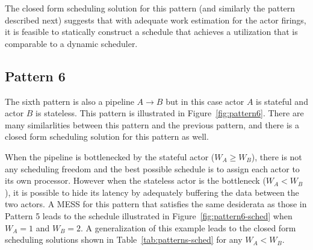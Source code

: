 The closed form scheduling solution for this pattern (and similarly
the pattern described next) suggests that with adequate work
estimation for the actor firings, it is feasible to statically
construct a schedule that achieves a utilization that is comparable to
a dynamic scheduler.

\subsection{Pattern 6}

The sixth pattern is also a pipeline $A\rightarrow B$ but in this case
actor $A$ is stateful and actor $B$ is stateless. This pattern is
illustrated in Figure~\ref{fig:pattern6}. There are many similarlities
between this pattern and the previous pattern, and there is a closed
form scheduling solution for this pattern as well. 

When the pipeline is bottlenecked by the stateful actor ($W_A \ge
W_B$), there is not any scheduling freedom and the best possible
schedule is to assign each actor to its own processor. However when
the stateless actor is the bottleneck ($W_A < W_B$), it is possible to
hide its latency by adequately buffering the data between the two
actors. A MESS for this pattern that satisfies the same desiderata as
those in Pattern 5 leads to the schedule illustrated in
Figure~\ref{fig:pattern6-sched} when $W_A = 1$ and $W_B = 2$.  A
generalization of this example leads to the closed form scheduling
solutions shown in Table~\ref{tab:patterns-sched} for any $W_A < W_B$.
